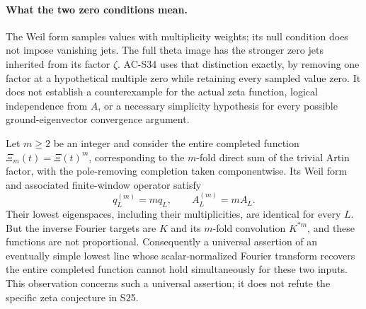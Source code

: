 \paragraph{What the two zero conditions mean.}
The Weil form samples values with multiplicity weights;
its null condition does not impose vanishing jets.
The full theta image has the stronger zero jets inherited
from its factor $\zeta$.  AC-S34 uses that distinction
exactly, by removing one factor at a hypothetical multiple
zero while retaining every sampled value zero.
It does not establish a counterexample for the actual
zeta function, logical independence from $A$, or a
necessary simplicity hypothesis for every possible
ground-eigenvector convergence argument.

\begin{proposition}
\label{AC-S35}
Let $m\geq2$ be an integer and consider the entire
completed function $\Xi_m(t)=\Xi(t)^m$, corresponding
to the $m$-fold direct sum of the trivial Artin factor,
with the pole-removing completion taken componentwise.
Its Weil form and associated finite-window operator satisfy
\[
           q_L^{(m)}=m q_L,\qquad A_L^{(m)}=m A_L.
                                                        \tag{SM.13}
\]
Their lowest eigenspaces, including their multiplicities,
are identical for every $L$.  But the inverse Fourier
targets are $K$ and its $m$-fold convolution $K^{*m}$,
and these functions are not proportional.
Consequently a universal assertion of an eventually
simple lowest line whose scalar-normalized Fourier
transform recovers the entire completed function
cannot hold simultaneously for these two inputs.
This observation concerns such a universal assertion;
it does not refute the specific zeta conjecture in S25.
\end{proposition}
